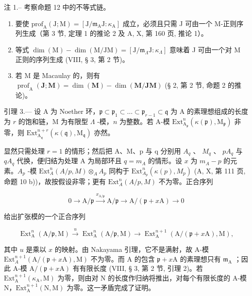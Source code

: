 注 1.-- 考察命题 12 中的不等式链。

\begin{enumerate}
\def\labelenumi{\alph{enumi})}
\item
  要使 \(\mathrm{prof}_{\mathrm{A}}(\mathrm{J};\mathrm{M}) = [\mathrm{J} / \mathfrak{m}_{\mathrm{A}}\mathrm{J}:\kappa_{\mathrm{A}}]\) 成立，必须且只需 J 可由一个 M-正则序列生成（第 3 节, 定理 1 的推论 2 及 A, X, 第 160 页, 推论 1）。
\item
  等式 \(\dim(\mathrm{M}) - \dim(\mathrm{M}/\mathrm{JM}) = [\mathrm{J}/\mathfrak{m}_{\Lambda}\mathrm{J} : \kappa_{\Lambda}]\) 意味着 J 可由一个对 M 正则的序列生成 (VIII, § 3, 第 2 节)。
\item
  若 M 是 Macaulay 的，则有 \(\operatorname{prof}_{\mathrm{A}}(\mathbf{J};\mathbf{M}) = \dim (\mathbf{M}) - \dim (\mathbf{M} / \mathbf{JM})\) (§ 2, 第 2 节, 命题 2 的推论)。
\end{enumerate}

引理 3.--- 设 A 为 Noether 环，\(\mathfrak{p} \subset \mathfrak{p}_1 \subset \ldots \subset \mathfrak{p}_{r-1} \subset \mathfrak{q}\) 为 A 的素理想组成的长度为 \(r\) 的饱和链，M 为有限型 \(\Lambda\) -模，\(n\) 为整数。若 A-模 \(\mathrm{Ext}_{\mathrm{A}_{\mathfrak{p}}}^{n}(\kappa(\mathfrak{p}), \mathrm{M}_{\mathfrak{p}})\) 非零，则 \(\mathrm{Ext}_{\mathrm{A}_{\mathfrak{q}}}^{n+r}(\kappa(\mathfrak{q}), \mathrm{M}_{\mathfrak{q}})\) 亦然。

显然只需处理 \(r = 1\) 的情形；然后把 A、M、p 与 q 分别用 \(A_q\) 、 \(M_q\) 、 \(pA_q\) 与 \(qA_q\) 代换，便归结为处理 A 为局部环且 \(q = m_A\) 的情形。设 \(x\) 为 \(m_A - p\) 的元素。\(A_p\) -模 \(\text{Ext}_A^n(A/p, M) \otimes_A A_p\) 同构于 \(\text{Ext}_{A_p}^n(\kappa(p), M_p)\) (A, X, 第 111 页, 命题 10 b))，故按假设非零；更有 \(\text{Ext}_A^n(A/p, M)\) 不为零。正合序列

\[
0 \rightarrow \mathrm{A} / \mathfrak {p} \stackrel {{x _ {\mathrm{A} / \mathfrak {p}}}} {{\longrightarrow}} \mathrm{A} / \mathfrak {p} \longrightarrow \mathrm{A} / (\mathfrak {p} + x \mathrm{A}) \rightarrow 0
\]

给出扩张模的一个正合序列

\[
\operatorname{Ext} _ {\mathrm{A}} ^ {n} (\mathrm{A} / \mathfrak {p}, \mathrm{M}) \xrightarrow {u} \operatorname{Ext} _ {\mathrm{A}} ^ {n} (\mathrm{A} / \mathfrak {p}, \mathrm{M}) \longrightarrow \operatorname{Ext} _ {\mathrm{A}} ^ {n + 1} (\mathrm{A} / (\mathfrak {p} + x \mathrm{A}), \mathrm{M}),
\]

其中 \(u\) 是乘以 \(x\) 的映射。由 Nakayama 引理，它不是满射，故 A-模 \(\text{Ext}_A^{n+1}(\text{A}/(\mathfrak{p} + x\text{A}), \text{M})\) 不为零。而 A 的包含 \(\mathfrak{p} + x\text{A}\) 的素理想只有 \(\mathfrak{m}_\text{A}\) ；因此 A-模 \(\text{A}/(\mathfrak{p} + x\text{A})\) 有有限长度 (VIII, § 3, 第 2 节, 引理 2)。若 \(\text{Ext}_\text{A}^{n+1}(\kappa_\text{A}, \text{M})\) 为零，则由对 N 的长度作归纳将推出，对每个有限长度的 A-模 N，\(\text{Ext}_\text{A}^{n+1}(\text{N}, \text{M})\) 为零。这一矛盾完成了证明。

